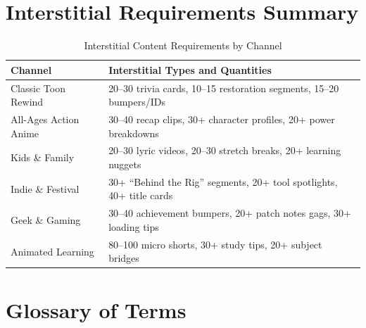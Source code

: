 \documentclass[12pt,letterpaper,twoside]{report}
\begin{document}
\chapter{Interstitial Requirements Summary}
\label{app:interstitials}

\begin{table}[H]
\centering
\caption{Interstitial Content Requirements by Channel}
\label{tab:interstitials-summary}
\begin{tabular}{@{}L{4cm}L{9.5cm}@{}}
\toprule
\textbf{Channel} & \textbf{Interstitial Types and Quantities} \\
\midrule
Classic Toon Rewind & 20--30 trivia cards, 10--15 restoration segments, 15--20 bumpers/IDs \\
\addlinespace
All-Ages Action Anime & 30--40 recap clips, 30+ character profiles, 20+ power breakdowns \\
\addlinespace
Kids \& Family & 20--30 lyric videos, 20--30 stretch breaks, 20+ learning nuggets \\
\addlinespace
Indie \& Festival & 30+ ``Behind the Rig'' segments, 20+ tool spotlights, 40+ title cards \\
\addlinespace
Geek \& Gaming & 30--40 achievement bumpers, 20+ patch notes gags, 30+ loading tips \\
\addlinespace
Animated Learning & 80--100 micro shorts, 30+ study tips, 20+ subject bridges \\
\bottomrule
\end{tabular}
\end{table}

\chapter{Glossary of Terms}
\label{app:glossary}
\end{document}
